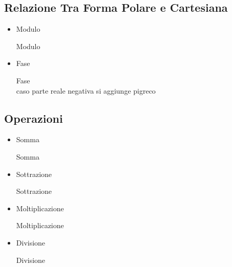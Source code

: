 \subsection{Relazione Tra Forma Polare e Cartesiana}
    \begin{itemize}
        \item {Modulo
            \begin{center}
                Modulo
            \end{center}
        }
        \item {Fase
            \begin{center}
                Fase\\
                caso parte reale negativa si aggiunge pigreco
            \end{center}
        }
    \end{itemize}


\subsection{Operazioni}
    \begin{itemize}
        \item {Somma
            \begin{center}
                Somma
            \end{center}
        }
        \item {Sottrazione
            \begin{center}
                Sottrazione
            \end{center}
        }
        \item {Moltiplicazione
            \begin{center}
                Moltiplicazione
            \end{center}
        }
        \item {Divisione
            \begin{center}
                Divisione
            \end{center}
        }
    \end{itemize}

\lipsum

